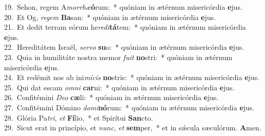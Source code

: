 {19.~}Sehon, regem A\textit{mor}\textit{rhæ}\textbf{ó}rum:~* quóniam in ætérnum misericórdia \textbf{e}jus.\\
{20.~}Et Og, \textit{re}\textit{gem} \textbf{Ba}san:~* quóniam in ætérnum misericórdia \textbf{e}jus.\\
{21.~}Et dedit terram eórum he\textit{re}\textit{di}\textbf{tá}tem:~* quóniam in ætérnum misericórdia \textbf{e}jus.\\
{22.~}Hereditátem Israël, \textit{ser}\textit{vo} \textbf{su}o:~* quóniam in ætérnum misericórdia \textbf{e}jus.\\
{23.~}Quia in humilitáte nostra memor \textit{fu}\textit{it} \textbf{no}stri:~* quóniam in ætérnum misericórdia \textbf{e}jus.\\
{24.~}Et redémit nos ab ini\textit{mí}\textit{cis} \textbf{no}stris:~* quóniam in ætérnum misericórdia \textbf{e}jus.\\
{25.~}Qui dat escam \textit{om}\textit{ni} \textbf{car}ni:~* quóniam in ætérnum misericórdia \textbf{e}jus.\\
{26.~}Confitémini \textit{De}\textit{o} \textbf{cæ}li:~* quóniam in ætérnum misericórdia \textbf{e}jus.\\
{27.~}Confitémini Dómino \textit{do}\textit{mi}\textbf{nó}rum:~* quóniam in ætérnum misericórdia \textbf{e}jus.\\
{28.~}Glória Pa\textit{tri}, \textit{et} \textbf{Fí}lio,~* et Spirítui \textbf{San}cto.\\
{29.~}Sicut erat in princípio, et \textit{nunc}, \textit{et} \textbf{sem}per,~* et in sǽcula sæculórum. \textbf{A}men.\\
